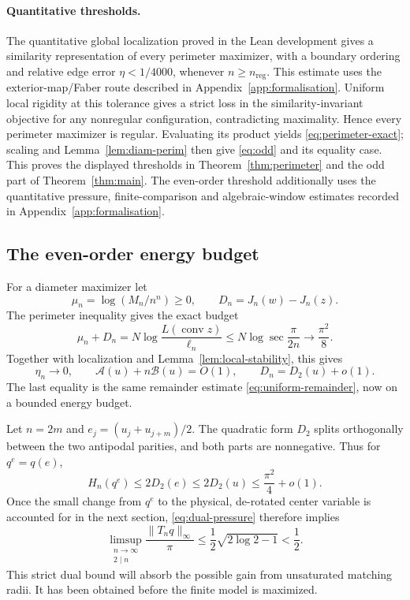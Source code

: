 \documentclass[11pt,reqno]{amsart}
\numberwithin{equation}{section}
\theoremstyle{definition}
\theoremstyle{remark}
\newcommand{\A}{\mathcal A}
\newcommand{\B}{\mathcal B}
\newcommand{\norm}[1]{\lVert #1\rVert}
\DeclareMathOperator{\conv}{conv}
\begin{document}
\paragraph{Quantitative thresholds.}
The quantitative global localization proved in the Lean development gives a similarity representation of every perimeter maximizer, with a boundary ordering and relative edge error $\eta<1/4000$, whenever $n\ge n_{\mathrm{reg}}$. This estimate uses the exterior-map/Faber route described in Appendix~\ref{app:formalisation}. Uniform local rigidity at this tolerance gives a strict loss in the similarity-invariant objective for any nonregular configuration, contradicting maximality. Hence every perimeter maximizer is regular. Evaluating its product yields \eqref{eq:perimeter-exact}; scaling and Lemma~\ref{lem:diam-perim} then give \eqref{eq:odd} and its equality case. This proves the displayed thresholds in Theorem~\ref{thm:perimeter} and the odd part of Theorem~\ref{thm:main}. The even-order threshold additionally uses the quantitative pressure, finite-comparison and algebraic-window estimates recorded in Appendix~\ref{app:formalisation}.

\subsection{The even-order energy budget}
For a diameter maximizer let
\[
 \mu_n=\log(M_n/n^n)\ge0,\qquad D_n=J_n(w)-J_n(z).
\]
The perimeter inequality gives the exact budget
\begin{equation}\label{eq:perimeter-budget}
 \mu_n+D_n=N\log\frac{L(\conv z)}{\ell_n}
 \le N\log\sec\frac\pi{2n}\longrightarrow\frac{\pi^2}{8}.
\end{equation}
Together with localization and Lemma~\ref{lem:local-stability}, this gives
\begin{equation}\label{eq:energy-budget}
 \eta_n\to0,\qquad \A(u)+n\B(u)=O(1),
 \qquad D_n=D_2(u)+o(1).
\end{equation}
The last equality is the same remainder estimate \eqref{eq:uniform-remainder}, now on a bounded energy budget.

Let $n=2m$ and $e_j=(u_j+u_{j+m})/2$. The quadratic form $D_2$ splits orthogonally between the two antipodal parities, and both parts are nonnegative. Thus for $q^e=q(e)$,
\begin{equation}\label{eq:initial-dual-budget}
 H_n(q^e)\le2D_2(e)\le2D_2(u)\le\frac{\pi^2}{4}+o(1).
\end{equation}
Once the small change from $q^e$ to the physical, de-rotated center variable is accounted for in the next section, \eqref{eq:dual-pressure} therefore implies
\begin{equation}\label{eq:pressure-gap-limit}
 \limsup_{\substack{n\to\infty\\2\mid n}}
 \frac{\norm{T_nq}_\infty}{\pi}
 \le\frac12\sqrt{2\log2-1}<\frac12.
\end{equation}
This strict dual bound will absorb the possible gain from unsaturated matching radii. It has been obtained before the finite model is maximized.
\end{document}

